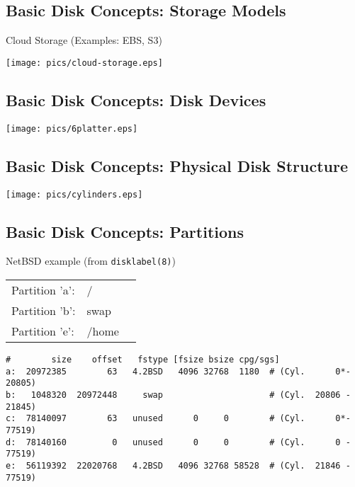 \documentclass[xga]{xdvislides}
\begin{document}
\subsection{Basic Disk Concepts: Storage Models}
Cloud Storage (Examples: EBS, S3)
\vfill
\begin{center}
	\texttt{[image: pics/cloud-storage.eps]} \\
\end{center}
\vfill

\subsection{Basic Disk Concepts: Disk Devices}
\vfill
	\begin{center}
		\texttt{[image: pics/6platter.eps]} \\
	\end{center}
\vfill

\subsection{Basic Disk Concepts: Physical Disk Structure}
\vfill
	\begin{center}
		\texttt{[image: pics/cylinders.eps]} \\
	\end{center}
\vfill

\subsection{Basic Disk Concepts: Partitions}
NetBSD example (from {\tt disklabel(8)})

\begin{tabular}{ l l c }
Partition 'a': & / & \\
Partition 'b': & swap & \\
Partition 'e': & /home & \\
\end{tabular}

\begin{verbatim}
#        size    offset   fstype [fsize bsize cpg/sgs]
a:  20972385        63   4.2BSD   4096 32768  1180  # (Cyl.      0*- 20805)
b:   1048320  20972448     swap                     # (Cyl.  20806 - 21845)
c:  78140097        63   unused      0     0        # (Cyl.      0*- 77519)
d:  78140160         0   unused      0     0        # (Cyl.      0 - 77519)
e:  56119392  22020768   4.2BSD   4096 32768 58528  # (Cyl.  21846 - 77519)
\end{verbatim}
\end{document}
